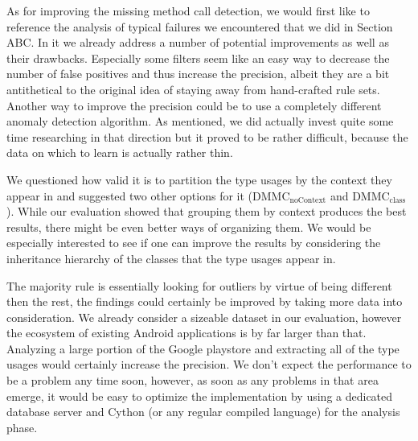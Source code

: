 As for improving the missing method call detection, we would first like to reference the analysis of typical failures we encountered that we did in Section ABC.
In it we already address a number of potential improvements as well as their drawbacks.
Especially some filters seem like an easy way to decrease the number of false positives and thus increase the precision, albeit they are a bit antithetical to the original idea of staying away from hand-crafted rule sets.
Another way to improve the precision could be to use a completely different anomaly detection algorithm.
As mentioned, we did actually invest quite some time researching in that direction but it proved to be rather difficult, because the data on which to learn is actually rather thin.

We questioned how valid it is to partition the type usages by the context they appear in and suggested two other options for it ($\text{DMMC}_\text{noContext}$ and $\text{DMMC}_\text{class}$).
While our evaluation showed that grouping them by context produces the best results, there might be even better ways of organizing them.
We would be especially interested to see if one can improve the results by considering the inheritance hierarchy of the classes that the type usages appear in.

The majority rule is essentially looking for outliers by virtue of being different then the rest, the findings could certainly be improved by taking more data into consideration.
We already consider a sizeable dataset in our evaluation, however the ecosystem of existing Android applications is by far larger than that.
Analyzing a large portion of the Google playstore and extracting all of the type usages would certainly increase the precision.
We don't expect the performance to be a problem any time soon, however, as soon as any problems in that area emerge, it would be easy to optimize the implementation by using a dedicated database server and Cython (or any regular compiled language) for the analysis phase.

